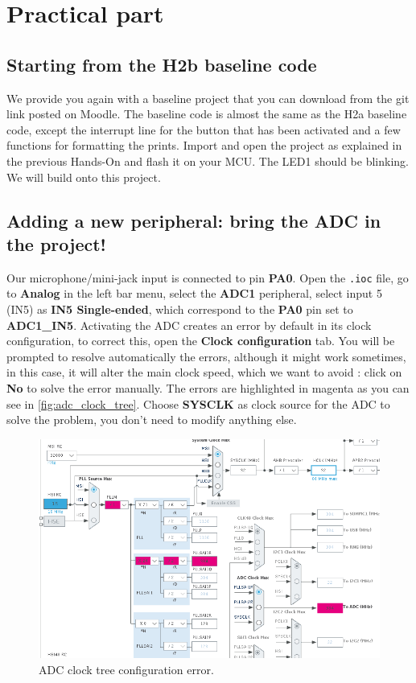 \clearpage
\section{Practical part}


\subsection{Starting from the H2b baseline code}
We provide you again with a baseline project that you can download from the git link posted on Moodle. The baseline code is almost the same as the H2a baseline code, except the interrupt line for the button that has been activated and a few functions for formatting the prints. Import and open the project as explained in the previous Hands-On and flash it on your MCU. The LED1 should be blinking. We will build onto this project.


\subsection{Adding a new peripheral: bring the ADC in the project!}
Our microphone/mini-jack input is connected to pin \textbf{PA0}. Open the \texttt{.ioc} file, go to \textbf{Analog} in the left bar menu, select the \textbf{ADC1} peripheral, select input 5 (IN5) as \textbf{IN5 Single-ended}, which correspond to the \textbf{PA0} pin set to \textbf{ADC1\_IN5}. Activating the ADC creates an error by default in its clock configuration, to correct this, open the \textbf{Clock configuration} tab. You will be prompted to resolve automatically the errors, although it might work sometimes, in this case, it will alter the main clock speed, which we want to avoid : click on \textbf{No} to solve the error manually. The errors are highlighted in magenta as you can see in \autoref{fig:adc_clock_tree}. Choose \textbf{SYSCLK} as clock source for the ADC to solve the problem, you don't need to modify anything else.

\begin{figure}[h]
    \centering
    \includegraphics[scale=0.4]{figures/adc_clock_tree.png}
    \caption{ADC clock tree configuration error. }
    \label{fig:adc_clock_tree}
\end{figure}

